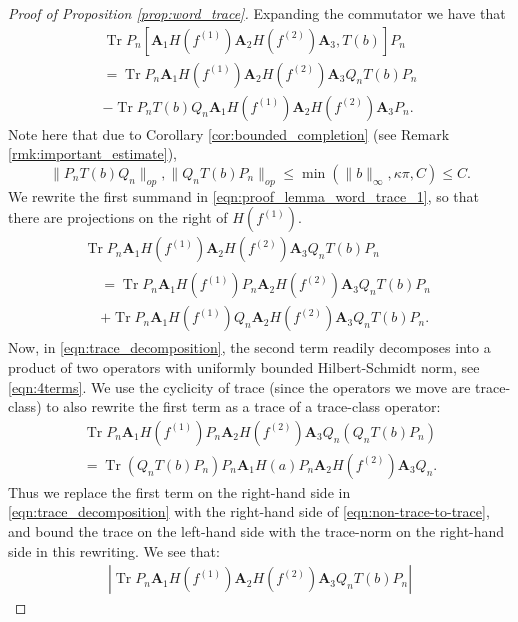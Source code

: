 \documentclass[11pt]{amsart}
\theoremstyle{plain}
\theoremstyle{remark}
\DeclareMathOperator{\Tr}{Tr}
\numberwithin{equation}{section}
\begin{document}
\begin{proof}[Proof of Proposition \ref{prop:word_trace}]
Expanding the commutator we have that
\begin{multline}\label{eqn:proof_lemma_word_trace_1}
\Tr P_n[ \mathbf{A}_1 H(f^{(1)}) \mathbf{A}_2 H(f^{(2)}) \mathbf{A}_3, T(b)]P_n
\\=\Tr P_n \mathbf{A}_1 H(f^{(1)}) \mathbf{A}_2 H(f^{(2)}) \mathbf{A}_3Q_nT(b)P_n
\\- \Tr P_n T(b) Q_n\mathbf{A}_1 H(f^{(1)}) \mathbf{A}_2 H(f^{(2)}) \mathbf{A}_3P_n.
\end{multline}
Note here that due to Corollary \ref{cor:bounded_completion} (see Remark \ref{rmk:important_estimate}),
$$\|P_nT(b)Q_n\|_{op}, \|Q_n T(b)P_n\|_{op}\leq \min(\|b\|_{\infty}, \kappa\pi, C)\leq C.$$
We rewrite the first summand in \eqref{eqn:proof_lemma_word_trace_1}, so that there are projections on the right of $H(f^{(1)})$.
\begin{multline}\label{eqn:trace_decomposition}
\Tr P_n \mathbf{A}_1 H(f^{(1)}) \mathbf{A}_2 H(f^{(2)}) \mathbf{A}_3Q_nT(b)P_n
\\
\begin{aligned}
&=\Tr P_n \mathbf{A}_1 H(f^{(1)})P_n \mathbf{A}_2 H(f^{(2)}) \mathbf{A}_3Q_nT(b)P_n
\\ &+\Tr P_n \mathbf{A}_1 H(f^{(1)})Q_n \mathbf{A}_2 H(f^{(2)}) \mathbf{A}_3Q_nT(b)P_n.
\end{aligned}
\end{multline}
Now, in \eqref{eqn:trace_decomposition}, the second term readily decomposes into a product of two operators with uniformly bounded Hilbert-Schmidt norm, see \eqref{eqn:4terms}. We use the cyclicity of trace (since the operators we move are trace-class) to also rewrite the first term as a trace of a trace-class operator:
\begin{multline}\label{eqn:non-trace-to-trace}
\Tr P_n \mathbf{A}_1 H(f^{(1)}) P_n
\mathbf{A}_2 H(f^{(2)}) 
\mathbf{A}_3Q_n(Q_nT(b)P_n)
\\= \Tr (Q_nT(b)P_n) 
P_n \mathbf{A}_1
H(a)P_n 
\mathbf{A}_2 H(f^{(2)}) \mathbf{A}_3Q_n.
\end{multline}
Thus we replace the first term on the right-hand side in \eqref{eqn:trace_decomposition} with the right-hand side of \eqref{eqn:non-trace-to-trace}, and bound the trace on the left-hand side with the trace-norm on the right-hand side in this rewriting. We see that:
\begin{multline}\label{eqn:4terms}
|\Tr P_n \mathbf{A}_1 H(f^{(1)}) \mathbf{A}_2 H(f^{(2)}) \mathbf{A}_3Q_nT(b)P_n|

\end{multline}
\end{proof}
\end{document}

